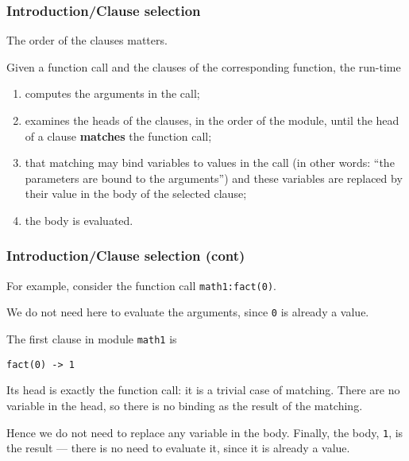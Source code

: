 %
\begin{frame}
\frametitle{Introduction/Clause selection}

The order of the clauses matters. 

\bigskip

Given a function call and the clauses of the corresponding function,
the \Erlang run-time
\begin{enumerate}

  \item computes the arguments in the call;

  \item examines the heads of the clauses, in the order of the
    module, until the head of a clause \textbf{matches} the function
    call;

  \item that matching may bind variables to values in the call (in
    other words: ``the parameters are bound to the arguments'') and
    these variables are replaced by their value in the body of the
    selected clause;

  \item the body is evaluated.

\end{enumerate}

\end{frame}

%
\begin{frame}[containsverbatim]
\frametitle{Introduction/Clause selection (cont)}

For example, consider the function call \texttt{math1:fact(0)}.

\bigskip

We do not need here to evaluate the arguments, since \texttt{0} is
already a value.

\bigskip

The first clause in module \texttt{math1} is
\begin{verbatim}
fact(0) -> 1
\end{verbatim}
Its head is exactly the function call: it is a trivial case of
matching. There are no variable in the head, so there is no binding as
the result of the matching. 

\bigskip

Hence we do not need to replace any variable in the body. Finally, the
body, \texttt{1}, is the result --- there is no need to evaluate it,
since it is already a value.

\end{frame}


